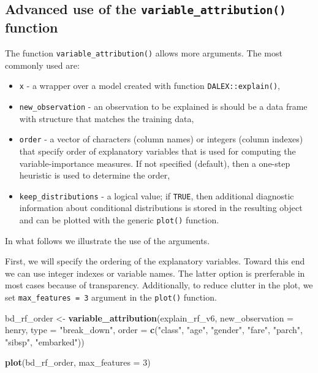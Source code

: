 \documentclass[]{krantz}
\newenvironment{Shaded}{\begin{snugshade}}{\end{snugshade}}
\newcommand{\DataTypeTok}[1]{\textcolor[rgb]{0.13,0.29,0.53}{#1}}
\newcommand{\DecValTok}[1]{\textcolor[rgb]{0.00,0.00,0.81}{#1}}
\newcommand{\KeywordTok}[1]{\textcolor[rgb]{0.13,0.29,0.53}{\textbf{#1}}}
\newcommand{\NormalTok}[1]{#1}
\newcommand{\StringTok}[1]{\textcolor[rgb]{0.31,0.60,0.02}{#1}}
\providecommand{\tightlist}{%
  \setlength{\itemsep}{0pt}\setlength{\parskip}{0pt}}
\begin{document}
\hypertarget{advanced-use-of-the-variable_attribution-function}{%
\subsection{\texorpdfstring{Advanced use of the \texttt{variable\_attribution()} function}{Advanced use of the variable\_attribution() function}}\label{advanced-use-of-the-variable_attribution-function}}

The function \texttt{variable\_attribution()} allows more arguments. The most commonly used are:

\begin{itemize}
\tightlist
\item
  \texttt{x} - a wrapper over a model created with function \texttt{DALEX::explain()},
\item
  \texttt{new\_observation} - an observation to be explained is should be a data frame with structure that matches the training data,
\item
  \texttt{order} - a vector of characters (column names) or integers (column indexes) that specify order of explanatory variables that is used for computing the variable-importance measures. If not specified (default), then a one-step heuristic is used to determine the order,
\item
  \texttt{keep\_distributions} - a logical value; if \texttt{TRUE}, then additional diagnostic information about conditional distributions is stored in the resulting object and can be plotted with the generic \texttt{plot()} function.
\end{itemize}

In what follows we illustrate the use of the arguments.

First, we will specify the ordering of the explanatory variables. Toward this end we can use integer indexes or variable names. The latter option is prerferable in most cases because of transparency. Additionally, to reduce clutter in the plot, we set \texttt{max\_features\ =\ 3} argument in the \texttt{plot()} function.

\begin{Shaded}
\begin{Highlighting}[]
\NormalTok{bd_rf_order <-}\StringTok{ }\KeywordTok{variable_attribution}\NormalTok{(explain_rf_v6,}
         \DataTypeTok{new_observation =}\NormalTok{ henry, }\DataTypeTok{type =} \StringTok{"break_down"}\NormalTok{,}
         \DataTypeTok{order =} \KeywordTok{c}\NormalTok{(}\StringTok{"class"}\NormalTok{, }\StringTok{"age"}\NormalTok{, }\StringTok{"gender"}\NormalTok{, }\StringTok{"fare"}\NormalTok{, }\StringTok{"parch"}\NormalTok{, }
                           \StringTok{"sibsp"}\NormalTok{, }\StringTok{"embarked"}\NormalTok{))}

\KeywordTok{plot}\NormalTok{(bd_rf_order, }\DataTypeTok{max_features =} \DecValTok{3}\NormalTok{) }
\end{Highlighting}
\end{Shaded}
\end{document}
